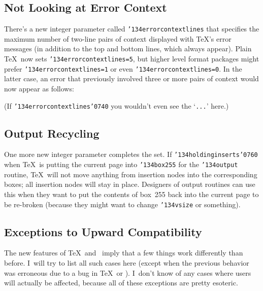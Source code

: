 \subsection{Not Looking at Error Context}

There's a new integer parameter called
{\tt{\char'134}errorcontextlines}
that specifies the maximum number of two-line pairs of context displayed with
\TeX's error messages (in addition to the top and bottom lines, which always
appear). Plain \TeX\ now sets
{\tt{\char'134}errorcontextlines=5},
but higher level format packages might prefer
{\tt{\char'134}errorcontextlines=1} 
or even
{\tt{\char'134}errorcontextlines=0}.
In the latter case, an error that previously involved three or more pairs of
context would now appear as follows:


\noindent
(If 
{\tt{\char'134}errorcontextlines{\char'074}0}
you wouldn't even see the `{\tt{...}}' here.)

\subsection{Output Recycling}

One more new integer parameter completes the set. If
{\tt{\char'134}holdinginserts{\char'076}0}
when \TeX\ is putting the current page into
{\tt{\char'134}box255}
for the 
{\tt{\char'134}output}
routine, \TeX\ will not move anything from insertion nodes into the
corresponding boxes; all insertion nodes will stay in place. Designers of
output routines can use this when they want to put the contents of box~255 back
into the current page to be re-broken (because they might want to change
{\tt{\char'134}vsize}
or something).

\subsection{Exceptions to Upward Compatibility}

The new features of \TeX\ and \MF\ imply that a few things work differently
than before. I~will try to list all such cases here (except when the 
previous behavior was erroneous due to a bug in \TeX\ or \MF\null).
I~don't know of any cases where users will actually be affected, because
all of these exceptions are pretty esoteric.

